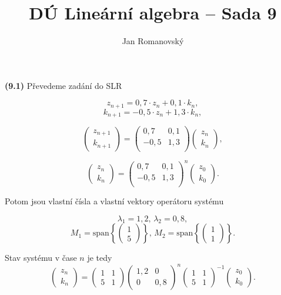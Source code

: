 \documentclass{article}
\title{DÚ Lineární algebra -- Sada 9}
\author{Jan Romanovský}
\begin{document}
\maketitle

\textbf{(9.1)} Převedeme zadání do SLR

$$z_{n+1} = 0,7\cdot z_n + 0,1 \cdot k_n,$$
$$k_{n+1} = - 0,5\cdot z_n + 1,3\cdot k_n,$$

$$\begin{pmatrix}
  z_{n+1} \\ k_{n+1}
\end{pmatrix}=\left(
\begin{array}{cc}
 0,7 & 0,1 \\
 -0,5 & 1,3 \\
\end{array}
\right)\begin{pmatrix}
  z_n \\ k_n
\end{pmatrix},$$

$$\begin{pmatrix}
  z_{n} \\ k_{n}
\end{pmatrix}=\left(
\begin{array}{cc}
 0,7 & 0,1 \\
 -0,5 & 1,3 \\
\end{array}
\right)^n\begin{pmatrix}
  z_0 \\ k_0
\end{pmatrix}.$$

Potom jsou vlastní čísla a vlastní vektory operátoru systému

$$\lambda_1 = 1,2, \, \lambda_2 = 0,8,$$
$$M_{1} = \text{span}\left\{\left(\begin{matrix}
  1 \\ 5
\end{matrix}\right)\right\}, \, M_{2} = \text{span}\left\{\left(\begin{matrix}
  1 \\ 1
\end{matrix}\right)\right\}.$$

Stav systému v čase $n$ je tedy
$$\begin{pmatrix}
  z_n \\ k_n
\end{pmatrix} = \begin{pmatrix}
  1 & 1 \\ 5 & 1
\end{pmatrix}\begin{pmatrix}
  1,2 & 0 \\ 0 & 0,8
\end{pmatrix}^n\begin{pmatrix}
  1 & 1 \\ 5 & 1
\end{pmatrix}^{-1}\begin{pmatrix}
  z_0 \\ k_0
\end{pmatrix}.$$
\end{document}
